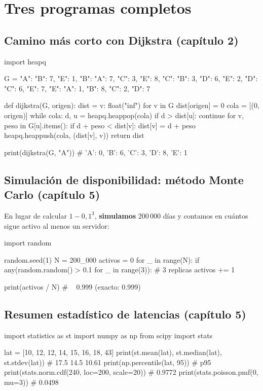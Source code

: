 \section*{Tres programas completos}
\subsection{Camino m\'as corto con Dijkstra (cap\'itulo 2)}
\begin{tmcodigo}
import heapq

G = {"A": {"B": 7, "E": 1},
     "B": {"A": 7, "C": 3, "E": 8},
     "C": {"B": 3, "D": 6, "E": 2},
     "D": {"C": 6, "E": 7},
     "E": {"A": 1, "B": 8, "C": 2, "D": 7}}

def dijkstra(G, origen):
    dist = {v: float("inf") for v in G}
    dist[origen] = 0
    cola = [(0, origen)]
    while cola:
        d, u = heapq.heappop(cola)
        if d > dist[u]:
            continue
        for v, peso in G[u].items():
            if d + peso < dist[v]:
                dist[v] = d + peso
                heapq.heappush(cola, (dist[v], v))
    return dist

print(dijkstra(G, "A"))   # {'A': 0, 'B': 6, 'C': 3, 'D': 8, 'E': 1}
\end{tmcodigo}

\subsection{Simulaci\'on de disponibilidad: m\'etodo Monte Carlo (cap\'itulo 5)}
En lugar de calcular $1-0{,}1^3$, \textbf{simulamos} 200\,000 d\'ias y contamos en cu\'antos sigue activo al menos un servidor:

\begin{tmcodigo}
import random

random.seed(1)
N = 200_000
activos = 0
for _ in range(N):
    if any(random.random() > 0.1 for _ in range(3)):   # 3 replicas
        activos += 1

print(activos / N)    # ~ 0.999 (exacto: 0.999)
\end{tmcodigo}

\subsection{Resumen estad\'istico de latencias (cap\'itulo 5)}
\begin{tmcodigo}
import statistics as st
import numpy as np
from scipy import stats

lat = [10, 12, 12, 14, 15, 16, 18, 43]
print(st.mean(lat), st.median(lat), st.stdev(lat))   # 17.5 14.5 10.61
print(np.percentile(lat, 95))                        # p95
print(stats.norm.cdf(240, loc=200, scale=20))        # 0.9772
print(stats.poisson.pmf(0, mu=3))                    # 0.0498
\end{tmcodigo}

